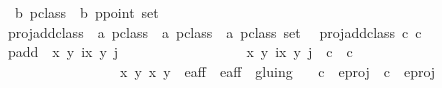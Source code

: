 %
	
\begin{isabellebody}%
\isamarkupfalse%
\ {\isacharparenleft}{\isacharprime}b{\isacharparenright}\ pclass\ {\isacharequal}\ {\isacartoucheopen}{\isacharparenleft}{\isacharprime}b{\isacharparenright}\ ppoint\ set{\isacartoucheclose} \\

proj{\isacharunderscore}add{\isacharunderscore}class\ {\isacharcolon}{\isacharcolon}\ {\isacharparenleft}{\isacharprime}a{\isacharparenright}\ pclass\ {\isasymRightarrow}\ {\isacharparenleft}{\isacharprime}a{\isacharparenright}\ pclass\ {\isasymRightarrow}\ {\isacharparenleft}{\isacharprime}a{\isacharparenright}\ pclass\ set\isanewline
\ \ proj{\isacharunderscore}add{\isacharunderscore}class\ c\ c\ {\isacharequal} {\isacharparenleft}p{\isacharunderscore}add\ {\isacharbackquote}\ {\isacharbraceleft}{\isacharparenleft}{\isacharparenleft}{\isacharparenleft}x\ y\ i{\isacharparenright}{\isacharcomma}{\isacharparenleft}{\isacharparenleft}x\ y\ j{\isacharparenright}{\isacharparenright}{\isachardot} \ \isanewline
\ \ \ \ \ \ \ \ \ \ \ \ \ \ \ \ {\isacharparenleft}{\isacharparenleft}{\isacharparenleft}x\ y\ i{\isacharparenright}{\isacharcomma}{\isacharparenleft}{\isacharparenleft}x\ y\ j{\isacharparenright}{\isacharparenright}\ {\isasymin}\ c\ {\isasymtimes}\ c\ {\isasymand}\ \isanewline
\ \ \ \ \ \ \ \ \ \ \ \ \ \ \ \ {\isacharparenleft}{\isacharparenleft}x\ y\ {\isacharparenleft}x\ y\ {\isasymin}\ e{\isacharprime}{\isacharunderscore}aff{\isacharunderscore}{}\ {\isasymunion}\ e{\isacharprime}{\isacharunderscore}aff{\isacharunderscore}{}{\isacharbraceright}{\isacharparenright}\ {\isacharslash}{\isacharslash}\ gluing\ \isanewline 
\ \ c\ {\isasymin}\ e{\isacharunderscore}proj\ \ c\ {\isasymin}\ e{\isacharunderscore}proj\ 
\isanewline

\end{isabellebody}%



